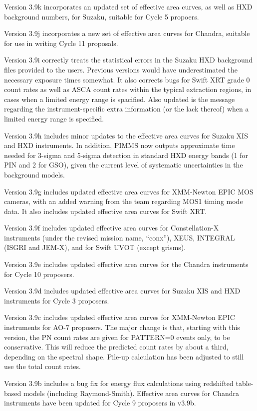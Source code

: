 \documentclass[11pt]{article}
\begin{document}
\begin{appendices}
Version 3.9k incorporates an updated set of effective area curves,
as well as HXD background numbers, for Suzaku, suitable for Cycle 5
propoers.

Version 3.9j incorporates a new set of effective area curves for Chandra,
suitable for use in writing Cycle 11 proposals.

Version 3.9i correctly treats the statistical errors in the Suzaku HXD
background files provided to the users.  Previous versions would have
underestimated the necessary exposure times somewhat.  It also corrects
bugs for Swift XRT grade 0 count rates as well as ASCA count rates within
the typical extraction regions, in cases when a limited energy range is
spacified.  Also updated is the message regarding the instrument-specific
extra information (or the lack thereof) when a limited energy range is
specified.

Version 3.9h includes minor updates to the effective area curves for
Suzaku XIS and HXD instruments.  In addition, PIMMS now outputs
approximate time needed for 3-sigma and 5-sigma detection in standard
HXD energy bands (1 for PIN and 2 for GSO), given the current level
of systematic uncertainties in the background models.

Version 3.9g includes updated effective area curves for XMM-Newton EPIC
MOS cameras, with an added warning from the team regarding MOS1 timing
mode data.  It also includes updated effective area curves for Swift
XRT.

Version 3.9f includes updated effective area curves for Constellation-X
instruments (under the revised mission name, ``conx''), XEUS, INTEGRAL
(ISGRI and JEM-X), and for Swift UVOT (except grisms).

Version 3.9e includes updated effective area curves for the
Chandra instruments for Cycle 10 proposers.

Version 3.9d includes updated effective area curves for Suzaku XIS
and HXD instruments for Cycle 3 proposers.

Version 3.9c includes updated effective area curves for XMM-Newton
EPIC instruments for AO-7 proposers.  The major change is that,
starting with this version, the PN count rates are given for
PATTERN=0 events only, to be conservative.  This will reduce the
predicted count rates by about a third, depending on the spectral
shape.  Pile-up calculation has been adjusted to still use the
total count rates.

Version 3.9b includes a bug fix for energy flux calculations using
redshifted table-based models (including Raymond-Smith).  Effective
area curves for Chandra instruments have been updated for Cycle 9
proposers in v3.9b.


\end{appendices}
\end{document}
